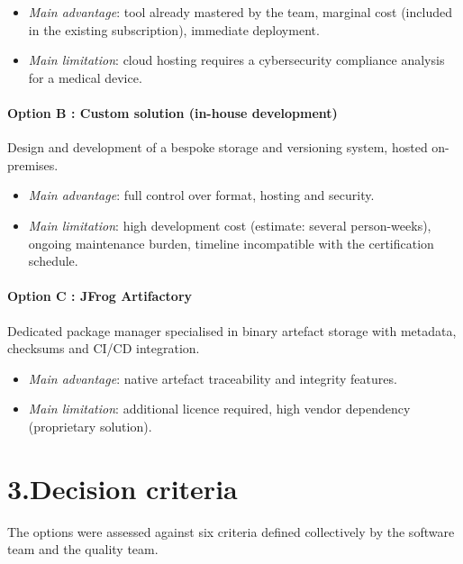 \begin{itemize}
  \item \textit{Main advantage}: tool already mastered by the team, marginal cost (included in the existing subscription), immediate deployment.
  \item \textit{Main limitation}: cloud hosting requires a cybersecurity compliance analysis for a medical device.
\end{itemize}

\paragraph{Option B : Custom solution (in-house development)}
Design and development of a bespoke storage and versioning system, hosted on-premises.

\begin{itemize}
  \item \textit{Main advantage}: full control over format, hosting and security.
  \item \textit{Main limitation}: high development cost (estimate: several person-weeks), ongoing maintenance burden, timeline incompatible with the certification schedule.
\end{itemize}

\paragraph{Option C : JFrog Artifactory}
Dedicated package manager specialised in binary artefact storage with metadata, checksums and CI/CD integration.

\begin{itemize}
  \item \textit{Main advantage}: native artefact traceability and integrity features.
  \item \textit{Main limitation}: additional licence required, high vendor dependency (proprietary solution).
\end{itemize}

\section*{3.\quad Decision criteria}

The options were assessed against six criteria defined collectively by the software team and the quality team.

